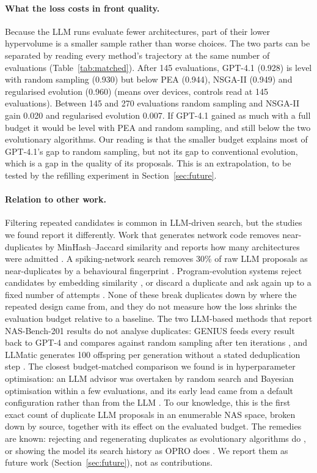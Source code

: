 \paragraph{What the loss costs in front quality.} Because the LLM runs evaluate fewer architectures, part of their lower hypervolume is a smaller sample rather than worse choices. The two parts can be separated by reading every method's trajectory at the same number of evaluations (Table~\ref{tab:matched}). After 145 evaluations, GPT-4.1 (0.928) is level with random sampling (0.930) but below PEA (0.944), NSGA-II (0.949) and regularised evolution (0.960) (means over devices, controls read at 145 evaluations). Between 145 and 270 evaluations random sampling and NSGA-II gain 0.020 and regularised evolution 0.007. If GPT-4.1 gained as much with a full budget it would be level with PEA and random sampling, and still below the two evolutionary algorithms. Our reading is that the smaller budget explains most of GPT-4.1's gap to random sampling, but not its gap to conventional evolution, which is a gap in the quality of its proposals. This is an extrapolation, to be tested by the refilling experiment in Section~\ref{sec:future}.

\paragraph{Relation to other work.} Filtering repeated candidates is common in LLM-driven search, but the studies we found report it differently. Work that generates network code removes near-duplicates by MinHash--Jaccard similarity and reports how many architectures were admitted \cite{khalid26,adhikari26}. A spiking-network search removes 30\% of raw LLM proposals as near-duplicates by a behavioural fingerprint \cite{zhao26spiking}. Program-evolution systems reject candidates by embedding similarity \cite{shinka}, or discard a duplicate and ask again up to a fixed number of attempts \cite{lyria}. None of these break duplicates down by where the repeated design came from, and they do not measure how the loss shrinks the evaluation budget relative to a baseline. The two LLM-based methods that report NAS-Bench-201 results do not analyse duplicates: GENIUS feeds every result back to GPT-4 and compares against random sampling after ten iterations \cite{genius}, and LLMatic generates 100 offspring per generation without a stated deduplication step \cite{llmatic}. The closest budget-matched comparison we found is in hyperparameter optimisation: an LLM advisor was overtaken by random search and Bayesian optimisation within a few evaluations, and its early lead came from a default configuration rather than from the LLM \cite{rodrigues26}. To our knowledge, this is the first exact count of duplicate LLM proposals in an enumerable NAS space, broken down by source, together with its effect on the evaluated budget. The remedies are known: rejecting and regenerating duplicates as evolutionary algorithms do \cite{mauldin84,lyria}, or showing the model its search history as OPRO does \cite{opro}. We report them as future work (Section~\ref{sec:future}), not as contributions.

